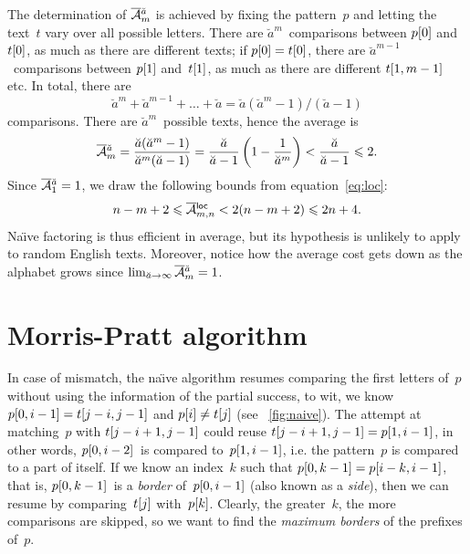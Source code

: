 The determination of \(\OM{\breve{a}}{m}\) is achieved by fixing the
pattern~\(p\) and letting the text~\(t\) vary over all possible
letters. There are \(\breve{a}^{m}\)~comparisons between
\({p}[{0}]\) and~\({t}[{0}]\), as much as there are different
texts; if \({p}[{0}]={t}[{0}]\), there are
\(\breve{a}^{m-1}\)~comparisons between \({p}[{1}]\)
and~\({t}[{1}]\), as much as there are different \({t}[{1,m-1}]\)
etc. In total, there are
\begin{equation*}
\breve{a}^{m} + \breve{a}^{m-1} + \dots +
\breve{a} = \breve{a}(\breve{a}^{m} - 1)/(\breve{a}-1)
\end{equation*}
comparisons. There are \(\breve{a}^m\)~possible texts, hence the
average is
\begin{equation*}
\OM{\breve{a}}{m}
 = \frac{\breve{a}(\breve{a}^{m}-1)}{\breve{a}^m(\breve{a}-1)}
 = \frac{\breve{a}}{\breve{a}-1}\left(1
                          - \frac{1}{\breve{a}^{m}}\right)
 < \frac{\breve{a}}{\breve{a}-1}
 \leqslant 2.
\end{equation*}
Since \(\OM{\breve{a}}{1} = 1\), we draw the following bounds from
equation~\eqref{eq:loc}:
\begin{equation*}
n - m + 2 \leqslant \OM{\fun{loc}}{m,n} < 2(n-m+2) \leqslant 2n + 4.
\end{equation*}
Na\"{\i}ve factoring is thus efficient in average, but its hypothesis
is unlikely to apply to random English texts. Moreover, notice how the
average cost gets down as the alphabet grows since \(\lim_{\breve{a}
  \to \infty}\OM{\breve{a}}{m} = 1\). 


\section{Morris-Pratt algorithm}

In case of mismatch, the na\"{\i}ve algorithm resumes comparing the
first letters of~\(p\) without using the information of the partial
success, to wit, we know \({p}[{0,i-1}] = {t}[{j-i,j-1}]\) and
\({p}[{i}] \neq {t}[{j}]\) (see \fig~\vref{fig:naive}).  The
attempt at matching~\(p\) with \({t}[{j-i+1,j-1}]\) could reuse
\({t}[{j-i+1,j-1}] = {p}[{1,i-1}]\), in other words,
\({p}[{0,i-2}]\)~is compared to~\({p}[{1,i-1}]\), i.e. the
pattern~\(p\) is compared to a part of itself. If we know an
index~\(k\) such that \({p}[{0,k-1}] = {p}[{i-k,i-1}]\), that is,
\({p}[{0,k-1}]\)~is a \emph{border} of~\({p}[{0,i-1}]\) (also
known as a \emph{side}), then
we can resume by comparing~\({t}[{j}]\)
with~\({p}[{k}]\). Clearly, the greater~\(k\), the more comparisons
are skipped, so we want to find the \emph{maximum borders} of the
prefixes of~\(p\).

